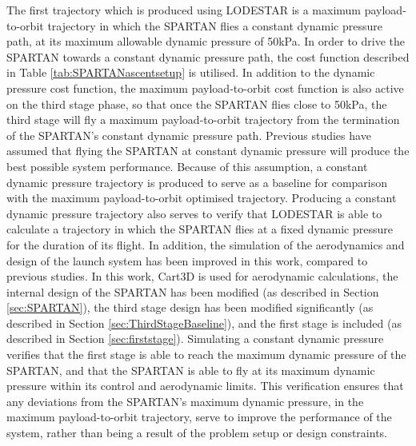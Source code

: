 The first trajectory which is produced using LODESTAR is a maximum payload-to-orbit trajectory in which the SPARTAN flies a constant dynamic pressure path, at its maximum allowable dynamic pressure of 50kPa. In order to drive the SPARTAN towards a constant dynamic pressure path, the cost function described in Table \ref{tab:SPARTANascentsetup} is utilised. In addition to the dynamic pressure cost function, the maximum payload-to-orbit cost function is also active on the third stage phase, so that once the SPARTAN flies close to 50kPa, the third stage will fly a maximum payload-to-orbit trajectory from the termination of the SPARTAN's constant dynamic pressure path.
Previous studies have assumed that flying the SPARTAN at constant dynamic pressure will produce the best possible system performance\cite{Preller2017b}. Because of this assumption, a constant dynamic pressure trajectory is produced to serve as a baseline for comparison with the maximum payload-to-orbit optimised trajectory. Producing a constant dynamic pressure trajectory also serves to verify that LODESTAR is able to calculate a trajectory in which the SPARTAN flies at a fixed dynamic pressure for the duration of its flight. 
In addition, the simulation of the aerodynamics and design of the launch system has been improved in this work, compared to previous studies\cite{Preller2017b}. In this work, Cart3D is used for aerodynamic calculations, the internal design of the SPARTAN has been modified (as described in Section \ref{sec:SPARTAN}), the third stage design has been modified significantly (as described in Section \ref{sec:ThirdStageBaseline}), and the first stage is included (as described in Section \ref{sec:firststage}). Simulating a constant dynamic pressure verifies that the first stage is able to reach the maximum dynamic pressure of the SPARTAN, and that the SPARTAN is able to fly at its maximum dynamic pressure within its control and aerodynamic limits. This verification ensures that any deviations from the SPARTAN's maximum dynamic pressure, in the maximum payload-to-orbit trajectory, serve to improve the performance of the system, rather than being a result of the problem setup or design constraints. 

